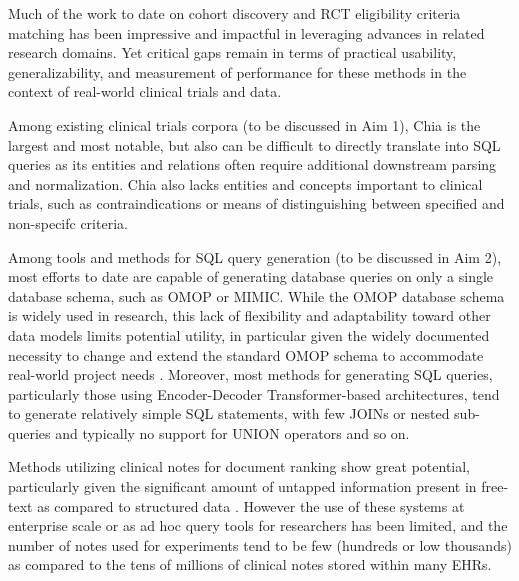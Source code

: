 \documentclass[../main.tex]{subfiles}
\begin{document}
Much of the work to date on cohort discovery and RCT eligibility criteria matching has been impressive and impactful in leveraging advances in related research domains. Yet critical gaps remain in terms of practical usability, generalizability, and measurement of performance for these methods in the context of real-world clinical trials and data. 

Among existing clinical trials corpora (to be discussed in Aim 1), Chia is the largest and most notable, but also can be difficult to directly translate into SQL queries as its entities and relations often require additional downstream parsing and normalization. Chia also lacks entities and concepts important to clinical trials, such as contraindications or means of distinguishing between specified and non-specifc criteria. 

Among tools and methods for SQL query generation (to be discussed in Aim 2), most efforts to date are capable of generating database queries on only a single database schema, such as OMOP or MIMIC. While the OMOP database schema is widely used in research, this lack of flexibility and adaptability toward other data models limits potential utility, in particular given the widely documented necessity to change and extend the standard OMOP schema to accommodate real-world project needs \cite{belenkaya2021extending, peng2021towards, zoch2021adaption, warner2019hemonc, zhou2013evaluation, shin2019genomic, kwon2019development}. Moreover, most methods for generating SQL queries, particularly those using Encoder-Decoder Transformer-based architectures, tend to generate relatively simple SQL statements, with few JOINs or nested sub-queries and typically no support for UNION operators and so on.

Methods utilizing clinical notes for document ranking show great potential, particularly given the significant amount of untapped information present in free-text as compared to structured data \cite{warrer2012using}. However the use of these systems at enterprise scale or as ad hoc query tools for researchers has been limited, and the number of notes used for experiments tend to be few (hundreds or low thousands) as compared to the tens of millions of clinical notes stored within many EHRs. 
\end{document}
